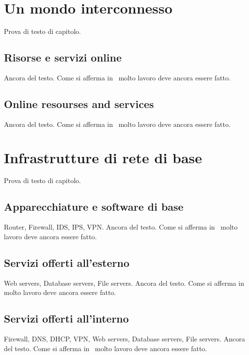 \section{Un mondo interconnesso}

Prova di testo di capitolo.

\subsection{Risorse e servizi online}

Ancora del testo. Come si afferma in~\cite{jones96analysis} molto lavoro deve ancora essere fatto.

\subsection{Online resourses and services}

Ancora del testo. Come si afferma in~\cite{jones96analysis} molto lavoro deve ancora essere fatto.

\section{Infrastrutture di rete di base}

Prova di testo di capitolo.

\subsection{Apparecchiature e software di base}

Router, Firewall, IDS, IPS, VPN. Ancora del testo. Come si afferma in~\cite{jones96analysis} molto lavoro deve ancora essere fatto.

\subsection{Servizi offerti all'esterno}

Web servers, Database servers, File servers. Ancora del testo. Come si afferma in~\cite{jones96analysis} molto lavoro deve ancora essere fatto.

\subsection{Servizi offerti all'interno}

Firewall, DNS, DHCP, VPN, Web servers, Database servers, File servers. Ancora del testo. Come si afferma in~\cite{jones96analysis} molto lavoro deve ancora essere fatto.


